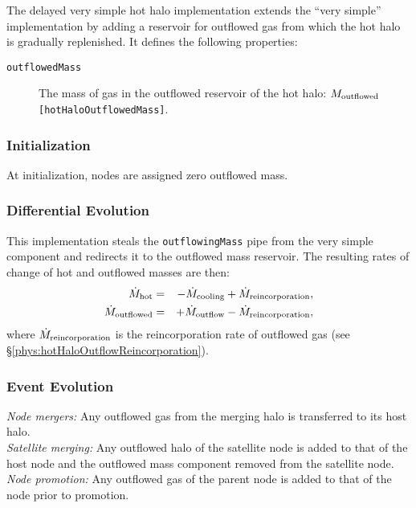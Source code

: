 The delayed very simple hot halo implementation extends the ``very simple'' implementation by adding a reservoir for outflowed gas from which the hot halo is gradually replenished. It defines the following properties:
\begin{description}
 \item [{\tt outflowedMass}] The mass of gas in the outflowed reservoir of the hot halo: $M_{\rm outflowed}$ {\tt [hotHaloOutflowedMass]}.
\end{description}

\subsubsection{Initialization}

At initialization, nodes are assigned zero outflowed mass.

\subsubsection{Differential Evolution}

This implementation steals the {\tt outflowingMass} pipe from the very simple component and redirects it to the outflowed mass reservoir. The resulting rates of change of hot and outflowed masses are then:
\begin{eqnarray}
 \dot{M}_{\rm hot}      &=& - \dot{M}_{\rm cooling} + \dot{M}_{\rm reincorporation}, \nonumber \\
 \dot{M}_{\rm outflowed} &=& + \dot{M}_{\rm outflow} - \dot{M}_{\rm reincorporation}, \nonumber \\
\end{eqnarray}
where $\dot{M}_{\rm reincorporation}$ is the reincorporation rate of outflowed gas (see \S\ref{phys:hotHaloOutflowReincorporation}).

\subsubsection{Event Evolution}

\noindent\emph{Node mergers:} Any outflowed gas from the merging halo is transferred to its host halo.\\

\noindent\emph{Satellite merging:} Any outflowed halo of the satellite \gls{node} is added to that of the host \gls{node} and the outflowed mass \gls{component} removed from the satellite node.\\

\noindent\emph{Node promotion:} Any outflowed gas of the parent \gls{node} is added to that of the \gls{node} prior to promotion.\\

